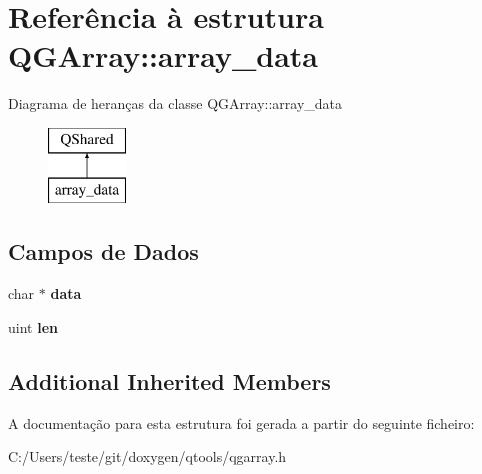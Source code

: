 \hypertarget{struct_q_g_array_1_1array__data}{\section{Referência à estrutura Q\-G\-Array\-:\-:array\-\_\-data}
\label{struct_q_g_array_1_1array__data}
}
Diagrama de heranças da classe Q\-G\-Array\-:\-:array\-\_\-data\begin{figure}[H]
\begin{center}
\leavevmode
\includegraphics[height=2.000000cm]{struct_q_g_array_1_1array__data}
\end{center}
\end{figure}
\subsection*{Campos de Dados}
\begin{DoxyCompactItemize}
\item 
\hypertarget{struct_q_g_array_1_1array__data_a91a70b77df95bd8b0830b49a094c2acb}{char $\ast$ {\bfseries data}}\label{struct_q_g_array_1_1array__data_a91a70b77df95bd8b0830b49a094c2acb}

\item 
\hypertarget{struct_q_g_array_1_1array__data_adc6f7cd3b6ef14af983b1294c313bc2d}{uint {\bfseries len}}\label{struct_q_g_array_1_1array__data_adc6f7cd3b6ef14af983b1294c313bc2d}

\end{DoxyCompactItemize}
\subsection*{Additional Inherited Members}


A documentação para esta estrutura foi gerada a partir do seguinte ficheiro\-:\begin{DoxyCompactItemize}
\item 
C\-:/\-Users/teste/git/doxygen/qtools/qgarray.\-h\end{DoxyCompactItemize}

